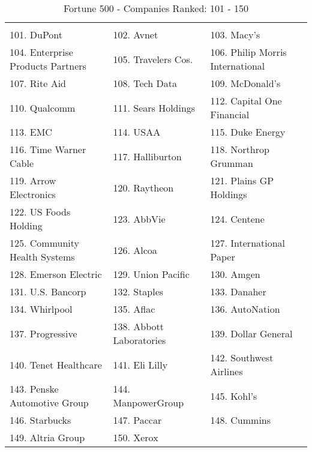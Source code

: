 \documentclass{article}
\begin{document}
\begin{table}[H]
\centering
\caption{Fortune 500 - Companies Ranked: 101 - 150}
\begin{tabular}{lll}
\hline
 \\ 101. DuPont 
&  102. Avnet 
&  103. Macy's 
\\ 104. Enterprise Products Partners 
&  105. Travelers Cos. 
&  106. Philip Morris International 
\\ 107. Rite Aid 
&  108. Tech Data 
&  109. McDonald's 
\\ 110. Qualcomm 
&  111. Sears Holdings 
&  112. Capital One Financial 
\\ 113. EMC 
&  114. USAA 
&  115. Duke Energy 
\\ 116. Time Warner Cable 
&  117. Halliburton 
&  118. Northrop Grumman 
\\ 119. Arrow Electronics 
&  120. Raytheon 
&  121. Plains GP Holdings 
\\ 122. US Foods Holding 
&  123. AbbVie 
&  124. Centene 
\\ 125. Community Health Systems 
&  126. Alcoa 
&  127. International Paper 
\\ 128. Emerson Electric 
&  129. Union Pacific 
&  130. Amgen 
\\ 131. U.S. Bancorp 
&  132. Staples 
&  133. Danaher 
\\ 134. Whirlpool 
&  135. Aflac 
&  136. AutoNation 
\\ 137. Progressive 
&  138. Abbott Laboratories 
&  139. Dollar General 
\\ 140. Tenet Healthcare 
&  141. Eli Lilly 
&  142. Southwest Airlines 
\\ 143. Penske Automotive Group 
&  144. ManpowerGroup 
&  145. Kohl's 
\\ 146. Starbucks 
&  147. Paccar 
&  148. Cummins 
\\ 149. Altria Group 
&  150. Xerox 
 &
 \\ \hline

\end{tabular}
\end{table}
\end{document}
